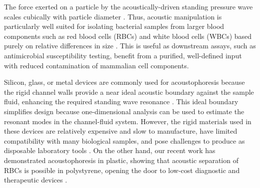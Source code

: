 The force exerted on a particle by the acoustically-driven standing pressure wave scales cubically with particle diameter \cite{settnes2012forces}. Thus, acoustic manipulation is particularly well suited for isolating bacterial samples from larger blood components such as red blood cells (RBCs) and white blood cells (WBCs) based purely on relative differences in size \cite{ohlsson2016integrated}\cite{li2016acoustofluidic}. This is useful as downstream assays, such as antimicrobial susceptibility testing, benefit from a purified, well-defined input with reduced contamination of mammalian cell components.

Silicon, glass, or metal devices are commonly used for acoustophoresis because the rigid channel walls provide a near ideal acoustic boundary against the sample fluid, enhancing the required standing wave resonance \cite{barnkob2009acoustofluidics}\cite{hill2008modelling}. This ideal boundary simplifies design because one-dimensional analysis can be used to estimate the resonant modes in the channel-fluid system. However, the rigid materials used in these devices are relatively expensive and slow to manufacture, have limited compatibility with many biological samples, and pose challenges to produce as disposable laboratory tools \cite{nge2013advances}.  On the other hand, our recent work has demonstrated acoustophoresis in plastic, showing that acoustic separation of RBCs is possible in polystyrene, opening the door to low-cost diagnostic and therapeutic devices \cite{mueller2013continuous}.

